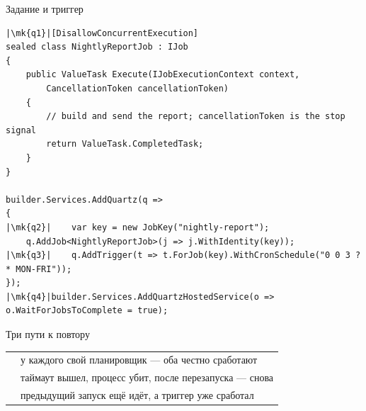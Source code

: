 \documentclass[aspectratio=169,10pt,t]{beamer}
\newcommand{\mk}[1]{\tikz[remember picture,overlay]\coordinate (#1) at (0,0.55ex);}
\begin{document}
\begin{frame}[fragile]{Задание и триггер}
  \vspace{0.3em}
\begin{lstlisting}[style=csharp,basicstyle=\ttfamily\fontsize{6.8}{7.7}\selectfont,escapechar=|]
|\mk{q1}|[DisallowConcurrentExecution]
sealed class NightlyReportJob : IJob
{
    public ValueTask Execute(IJobExecutionContext context,
        CancellationToken cancellationToken)
    {
        // build and send the report; cancellationToken is the stop signal
        return ValueTask.CompletedTask;
    }
}

builder.Services.AddQuartz(q =>
{
|\mk{q2}|    var key = new JobKey("nightly-report");
    q.AddJob<NightlyReportJob>(j => j.WithIdentity(key));
|\mk{q3}|    q.AddTrigger(t => t.ForJob(key).WithCronSchedule("0 0 3 ? * MON-FRI"));
});
|\mk{q4}|builder.Services.AddQuartzHostedService(o => o.WaitForJobsToComplete = true);
\end{lstlisting}

  \vspace{0.1em}
\end{frame}

\begin{frame}[plain]
\end{frame}

\begin{frame}{Три пути к повтору}
  \slidetop

  {\renewcommand{\arraystretch}{1.6}
  \begin{tabular}{@{}L{4.6cm}L{8.2cm}@{}}
           & у каждого свой планировщик --- оба честно
      сработают \\
     & таймаут вышел, процесс убит, после
      перезапуска --- снова \\
                & предыдущий запуск ещё идёт, а триггер уже
      сработал \\
  \end{tabular}}

  \slidegap
\end{frame}
\end{document}
